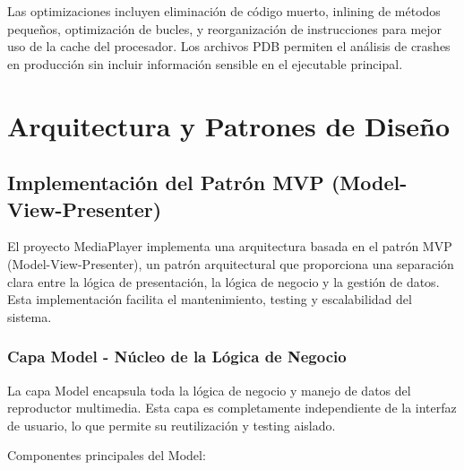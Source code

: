 \documentclass[a4paper]{article}
\begin{document}
Las optimizaciones incluyen eliminación de código muerto, inlining de métodos pequeños, optimización de bucles, y reorganización de instrucciones para mejor uso de la cache del procesador. Los archivos PDB permiten el análisis de crashes en producción sin incluir información sensible en el ejecutable principal.

\section{Arquitectura y Patrones de Diseño}

\subsection{Implementación del Patrón MVP (Model-View-Presenter)}

El proyecto MediaPlayer implementa una arquitectura basada en el patrón MVP (Model-View-Presenter), un patrón arquitectural que proporciona una separación clara entre la lógica de presentación, la lógica de negocio y la gestión de datos. Esta implementación facilita el mantenimiento, testing y escalabilidad del sistema.

\subsubsection{Capa Model - Núcleo de la Lógica de Negocio}

La capa Model encapsula toda la lógica de negocio y manejo de datos del reproductor multimedia. Esta capa es completamente independiente de la interfaz de usuario, lo que permite su reutilización y testing aislado.

Componentes principales del Model:
\end{document}
